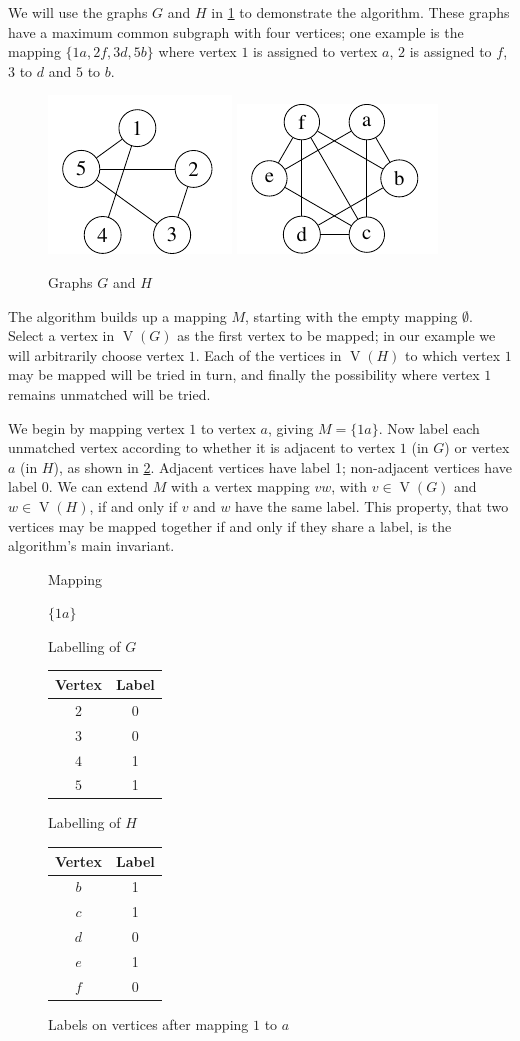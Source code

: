 \documentclass[letterpaper]{article}
\DeclareMathOperator{\V}{V}
\newcommand{\LabelTables}[4] {
  \centering
  \begin{minipage}[t]{#1\linewidth}
      Mapping

      \bigskip

      #2
  \end{minipage}
  \quad
  \begin{minipage}[t]{0.3\linewidth}
      \centering Labelling of $G$
      \begin{tabular}[t]{cc}
      \hline
          Vertex & Label\\
      \hline
          #3
      \hline
      \end{tabular}
  \end{minipage}
  \quad
  \begin{minipage}[t]{0.3\linewidth}
      \centering Labelling of $H$
      \begin{tabular}[t]{cc}
      \hline
          Vertex & Label\\
      \hline
          #4
      \hline
      \end{tabular}
  \end{minipage}
}
\begin{document}
We will use the graphs $G$ and $H$ in \cref{fig:alg1} to demonstrate the
algorithm.  These graphs have a maximum common subgraph with four vertices; one
example is the mapping $\{1a, 2f, 3d, 5b\}$ where vertex $1$ is assigned to
vertex $a$, $2$ is assigned to $f$, $3$ to $d$ and $5$ to $b$.

\begin{figure}[ht]
\centering
    \includegraphics{graph_G}
    \includegraphics{graph_H}
\caption{Graphs $G$ and $H$}
\label{fig:alg1}
\end{figure}

The algorithm builds up a mapping $M$, starting with the empty mapping
$\emptyset$. Select a vertex in $\V(G)$ as the first vertex to be mapped; in
our example we will arbitrarily choose vertex $1$. Each of the vertices in
$\V(H)$ to which vertex $1$ may be mapped will be tried in turn, and finally the
possibility where vertex $1$ remains unmatched will be tried.

We begin by mapping vertex $1$ to vertex $a$, giving $M=\{1a\}$.  Now label
each unmatched vertex according to whether it is adjacent to vertex $1$ (in
$G$) or vertex $a$ (in $H$), as shown in \cref{fig:alg2}.  Adjacent
vertices have label 1; non-adjacent vertices have label 0.  We can extend $M$
with a vertex mapping $vw$, with $v \in \V(G)$ and $w \in \V(H)$, if and only
if $v$ and $w$ have the same label.  This property, that two vertices may be
mapped together if and only if they share a label, is the algorithm's main
invariant.

\begin{figure}[ht]
  \LabelTables{.15}
              {$\{1a\}$}
              {$2$ & 0 \\
               $3$ & 0 \\
               $4$ & 1 \\
               $5$ & 1 \\}
              {$b$ & 1 \\
               $c$ & 1 \\
               $d$ & 0 \\
               $e$ & 1 \\
               $f$ & 0 \\}
  \caption{Labels on vertices after mapping $1$ to $a$}
\label{fig:alg2}
\end{figure}
\end{document}
